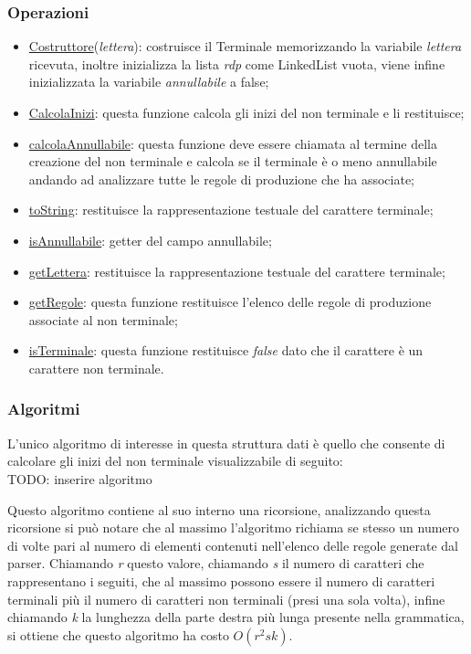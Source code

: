 \documentclass[12pt]{article}
\newcounter{subsubsubsection}[subsubsection]
\begin{document}
\subsubsection{Operazioni}
\begin{itemize}
\item\underline{Costruttore}(\textit{lettera}): costruisce il Terminale memorizzando la variabile \textit{lettera} ricevuta, inoltre inizializza la lista \textit{rdp} come LinkedList vuota, viene infine inizializzata la variabile \textit{annullabile} a false;
\item\underline{CalcolaInizi}: questa funzione calcola gli inizi del non terminale e li restituisce;
\item\underline{calcolaAnnullabile}: questa funzione deve essere chiamata al termine della creazione del non terminale e calcola se il terminale è o meno annullabile andando ad analizzare tutte le regole di produzione che ha associate;
\item\underline{toString}: restituisce la rappresentazione testuale del carattere terminale;
\item\underline{isAnnullabile}: getter del campo annullabile;
\item\underline{getLettera}: restituisce la rappresentazione testuale del carattere terminale;
\item\underline{getRegole}: questa funzione restituisce l'elenco delle regole di produzione associate al non terminale;
\item\underline{isTerminale}: questa funzione restituisce \textit{false} dato che il carattere è un carattere non terminale.
\end{itemize}
\subsubsection{Algoritmi}
L'unico algoritmo di interesse in questa struttura dati è quello che consente di calcolare gli inizi del non terminale visualizzabile di seguito:
\\ TODO: inserire algoritmo\par

\label{COSTOINIZI}
Questo algoritmo contiene al suo interno una ricorsione, analizzando questa ricorsione si può notare che al massimo l'algoritmo richiama se stesso un numero di volte pari al numero di elementi contenuti nell'elenco delle regole generate dal parser.
Chiamando \textit{r} questo valore, chiamando \textit{s} il numero di caratteri che rappresentano i seguiti, che al massimo possono essere il numero di caratteri terminali più il numero di caratteri non terminali (presi una sola volta), infine chiamando \textit{k} la lunghezza della parte destra più lunga presente nella grammatica, si ottiene che questo algoritmo ha costo $O(r^2 s k)$.
\end{document}
